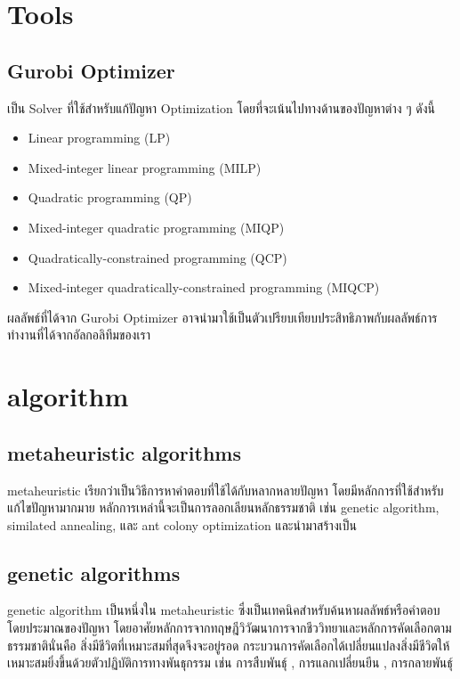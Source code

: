 \section{Tools}
\subsection{Gurobi Optimizer}
เป็น Solver ที่ใช้สำหรับแก้ปัญหา Optimization โดยที่จะเน้นไปทางด้านของปัญหาต่าง ๆ ดังนี้ 
\begin{itemize}
  \item Linear programming (LP)
  \item Mixed-integer linear programming (MILP)
  \item Quadratic programming (QP)
  \item Mixed-integer quadratic programming (MIQP)
  \item Quadratically-constrained programming (QCP)
  \item Mixed-integer quadratically-constrained programming (MIQCP)
\end{itemize}
ผลลัพธ์ที่ได้จาก Gurobi Optimizer อาจนำมาใช้เป็นตัวเปรียบเทียบประสิทธิภาพกับผลลัพธ์การทำงานที่ได้จากอัลกอลิทึมของเรา

\section{algorithm}
\subsection{metaheuristic algorithms}
meta­heuristic เรียกว่าเป็นวิธีการหาคำตอบที่ใช้ได้กับหลากหลายปัญหา โดยมีหลักการที่ใช้สำหรับแก้ไขปัญหามากมาย
หลักการเหล่านี้จะเป็นการลอกเลียนหลักธรรมชาติ เช่น genetic algorithm, similated annealing, และ ant colony
optimization และนำมาสร้างเป็น

\subsection{genetic algorithms}
genetic algorithm  เป็นหนึ่งใน metaheuristic ซึ่งเป็นเทคนิคสำหรับค้นหาผลลัพธ์หรือคำตอบโดยประมาณของปัญหา โดยอาศัยหลักการจากทฤษฎีวิวัฒนาการจากชีววิทยาและหลักการคัดเลือกตามธรรมชาตินั่นคือ 
สิ่งมีชีวิตที่เหมาะสมที่สุดจึงจะอยู่รอด กระบวนการคัดเลือกได้เปลี่ยนแปลงสิ่งมีชีวิตให้เหมาะสมยิ่งขึ้นด้วยตัวปฏิบัติการทางพันธุกรรม เช่น การสืบพันธุ์ , การแลกเปลี่ยนยีน , การกลายพันธุ์  


